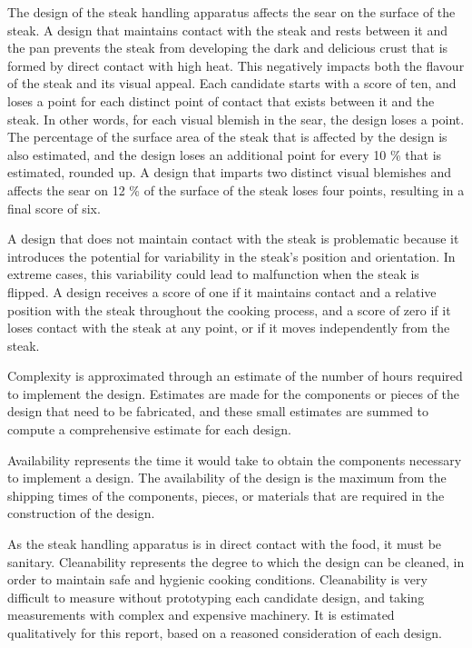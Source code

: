 \documentclass[11pt]{article}
\begin{document}
The design of the steak handling apparatus affects the sear on the surface of the steak.
A design that maintains contact with the steak and rests between it and the pan prevents the steak from developing the dark and delicious crust that is formed by direct contact with high heat.
This negatively impacts both the flavour of the steak and its visual appeal.
Each candidate starts with a score of ten, and loses a point for each distinct point of contact that exists between it and the steak.
In other words, for each visual blemish in the sear, the design loses a point.
The percentage of the surface area of the steak that is affected by the design is also estimated, and the design loses an additional point for every 10 \% that is estimated, rounded up.
A design that imparts two distinct visual blemishes and affects the sear on 12 \% of the surface of the steak loses four points, resulting in a final score of six.

A design that does not maintain contact with the steak is problematic because it introduces the potential for variability in the steak’s position and orientation.
In extreme cases, this variability could lead to malfunction when the steak is flipped.
A design receives a score of one if it maintains contact and a relative position with the steak throughout the cooking process, and a score of zero if it loses contact with the steak at any point, or if it moves independently from the steak.

Complexity is approximated through an estimate of the number of hours required to implement the design.
Estimates are made for the components or pieces of the design that need to be fabricated, and these small estimates are summed to compute a comprehensive estimate for each design.

Availability represents the time it would take to obtain the components necessary to implement a design.
The availability of the design is the maximum from the shipping times of the components, pieces, or materials that are required in the construction of the design.

As the steak handling apparatus is in direct contact with the food, it must be sanitary.
Cleanability represents the degree to which the design can be cleaned, in order to maintain safe and hygienic cooking conditions.
Cleanability is very difficult to measure without prototyping each candidate design, and taking measurements with complex and expensive machinery.
It is estimated qualitatively for this report, based on a reasoned consideration of each design.
\end{document}
